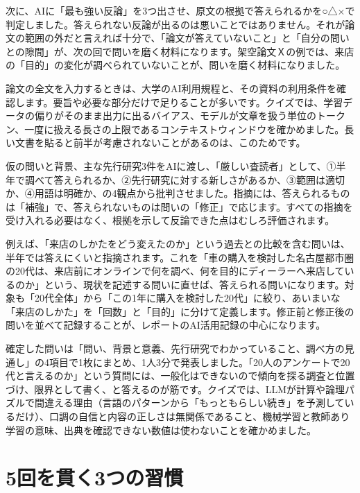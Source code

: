 次に、AIに「最も強い反論」を3つ出させ、原文の根拠で答えられるかを○△×で判定しました。答えられない反論が出るのは悪いことではありません。それが論文の範囲の外だと言えれば十分で、「論文が答えていないこと」と「自分の問いとの隙間」が、次の回で問いを磨く材料になります。架空論文Ｘの例では、来店の「目的」の変化が調べられていないことが、問いを磨く材料になりました。

論文の全文を入力するときは、大学のAI利用規程と、その資料の利用条件を確認します。要旨や必要な部分だけで足りることが多いです。クイズでは、学習データの偏りがそのまま出力に出るバイアス、モデルが文章を扱う単位のトークン、一度に扱える長さの上限であるコンテキストウィンドウを確かめました。長い文書を貼ると前半が考慮されないことがあるのは、このためです。


仮の問いと背景、主な先行研究3件をAIに渡し、「厳しい査読者」として、①半年で調べて答えられるか、②先行研究に対する新しさがあるか、③範囲は適切か、④用語は明確か、の4観点から批判させました。指摘には、答えられるものは「補強」で、答えられないものは問いの「修正」で応じます。すべての指摘を受け入れる必要はなく、根拠を示して反論できた点はむしろ評価されます。

例えば、「来店のしかたをどう変えたのか」という過去との比較を含む問いは、半年では答えにくいと指摘されます。これを「車の購入を検討した名古屋都市圏の20代は、来店前にオンラインで何を調べ、何を目的にディーラーへ来店しているのか」という、現状を記述する問いに直せば、答えられる問いになります。対象も「20代全体」から「この1年に購入を検討した20代」に絞り、あいまいな「来店のしかた」を「回数」と「目的」に分けて定義します。修正前と修正後の問いを並べて記録することが、レポートのAI活用記録の中心になります。

確定した問いは「問い、背景と意義、先行研究でわかっていること、調べ方の見通し」の4項目で1枚にまとめ、1人3分で発表しました。「20人のアンケートで20代と言えるのか」という質問には、一般化はできないので傾向を探る調査と位置づけ、限界として書く、と答えるのが筋です。クイズでは、LLMが計算や論理パズルで間違える理由（言語のパターンから「もっともらしい続き」を予測しているだけ）、口調の自信と内容の正しさは無関係であること、機械学習と教師あり学習の意味、出典を確認できない数値は使わないことを確かめました。

\section{5回を貫く3つの習慣}

